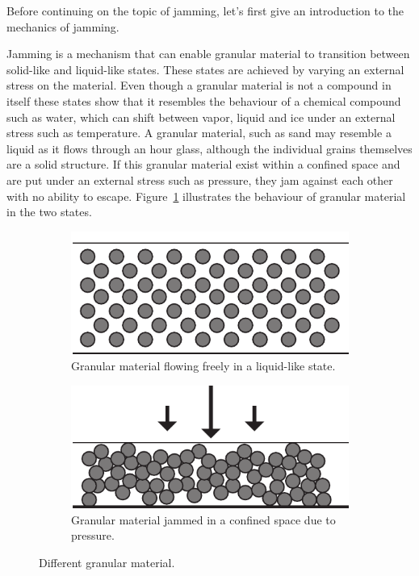 Before continuing on the topic of jamming, let's first give an introduction to the mechanics of jamming.

Jamming is a mechanism that can enable granular material to transition between solid-like and liquid-like states. 
These states are achieved by varying an external stress on the material.
Even though a granular material is not a compound in itself these states show that it resembles the behaviour of a chemical compound such as water, which can shift between vapor, liquid and ice under an external stress such as temperature.
A granular material, such as sand may resemble a liquid as it flows through an hour glass, although the individual grains themselves are a solid structure. 
If this granular material exist within a confined space and are put under an external stress such as pressure, they jam against each other with no ability to escape.
Figure~\ref{fig:ch:jamming:particles:jam_unjam} illustrates the behaviour of granular material in the two states.

\begin{figure}[h]
\centering
\begin{subfigure}[b]{.45\textwidth}
  \centering
  \includegraphics[width=\linewidth]{figures/jamming/particles_unjammed.pdf}
  \caption{Granular material flowing freely in a liquid-like state.}
\end{subfigure}%
\hspace{0.5cm}
\begin{subfigure}[b]{.45\textwidth}
  \centering
  \includegraphics[width=\linewidth]{figures/jamming/particles_jammed.pdf}
  \caption{Granular material jammed in a confined space due to pressure.}
\end{subfigure}
\caption{Different granular material.}
\label{fig:ch:jamming:particles:jam_unjam}
\end{figure}

